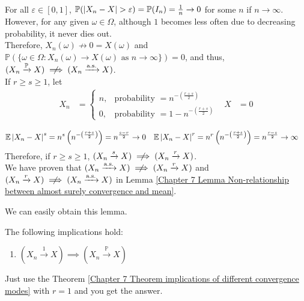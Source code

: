 \documentclass{huhtakm-template-book}
\newcommand{\prob}{\mathbb{P}}
\newcommand{\expect}{\mathbb{E}}
\begin{document}
\begin{proofing}
\begin{enumerate}
\begin{align*}
		\end{align*}
		For all $\varepsilon\in[0,1]$, $\prob(\abs{X_{n}-X}>\varepsilon)=\prob(I_{n})=\frac{1}{n}\to 0$ for some $n$ if $n\to\infty$.\\
		However, for any given $\omega\in\Omega$, although $1$ becomes less often due to decreasing probability, it never dies out.\\
		Therefore, $X_{n}(\omega)\not\to 0=X(\omega)$ and $\prob(\{\omega\in\Omega:X_{n}(\omega)\to X(\omega)\text{ as }n\to\infty\})=0$, and thus, $(X_{n}\xrightarrow{\prob}X)\centernot\implies(X_{n}\xrightarrow{\text{a.s.}}X)$.\\
		If $r\geq s\geq 1$, let
		\begin{align*}
			X_{n}&=\begin{cases}
				n, &\text{probability }=n^{-\left(\frac{r+s}{2}\right)}\\
				0, &\text{probability }=1-n^{-\left(\frac{r+s}{2}\right)}
			\end{cases} & X&=0
		\end{align*}
		
		\begin{align*}
			\expect\abs{X_{n}-X}^{s}&=n^{s}\left(n^{-\left(\frac{r+s}{2}\right)}\right)=n^{\frac{s-r}{2}}\to 0 & \expect\abs{X_{n}-X}^{r}&=n^{r}\left(n^{-\left(\frac{r+s}{2}\right)}\right)=n^{\frac{r-s}{2}}\to\infty
		\end{align*}
		Therefore, if $r\geq s\geq 1$, $(X_{n}\xrightarrow{s}X)\centernot\implies(X_{n}\xrightarrow{r}X)$.\\
		We have proven that $(X_{n}\xrightarrow{\text{a.s.}}X)\centernot\implies(X_{n}\xrightarrow{r}X)$ and $(X_{n}\xrightarrow{r}X)\centernot\implies(X_{n}\xrightarrow{\text{a.s.}}X)$ in Lemma \ref{Chapter 7 Lemma Non-relationship between almost surely convergence and mean}.
	\end{enumerate}
\end{proofing}
We can easily obtain this lemma.
\begin{lem}
	The following implications hold:
	\begin{enumerate}
		\item $(X_{n}\xrightarrow{1}X)\implies(X_{n}\xrightarrow{\prob}X)$
	\end{enumerate}
\end{lem}
\begin{proofing}
	Just use the Theorem \ref{Chapter 7 Theorem implications of different convergence modes} with $r=1$ and you get the answer.
\end{proofing}
\end{document}
